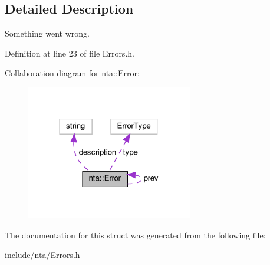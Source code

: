 \subsection{Detailed Description}
Something went wrong. 

Definition at line 23 of file Errors.\+h.



Collaboration diagram for nta\+:\+:Error\+:
\nopagebreak
\begin{figure}[H]
\begin{center}
\leavevmode
\includegraphics[width=206pt]{d7/dbb/structnta_1_1Error__coll__graph}
\end{center}
\end{figure}


The documentation for this struct was generated from the following file\+:\begin{DoxyCompactItemize}
\item 
include/nta/Errors.\+h\end{DoxyCompactItemize}
